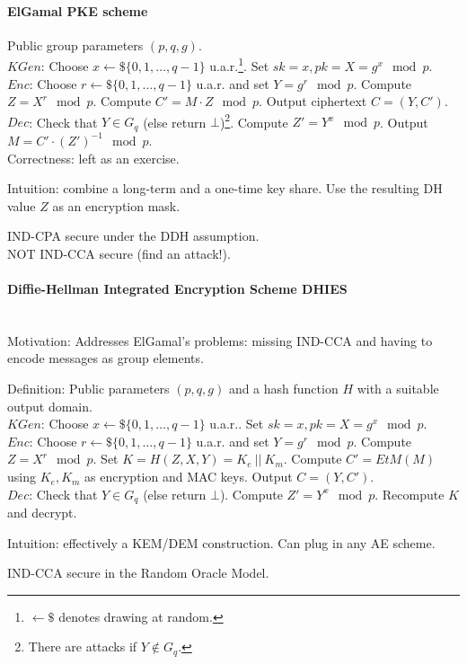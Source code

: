 \paragraph{ElGamal PKE scheme}
Public group parameters $(p, q, g)$.
\\
$KGen$:
Choose $x \leftarrow \$ \{ 0, 1, \dots, q-1 \}$ u.a.r.\footnote{$\leftarrow\$$ denotes drawing at random.}.
Set $sk = x, pk = X = g^x \mod p$.
\\
$Enc$:
Choose $r \leftarrow \$ \{ 0, 1, \dots, q-1 \}$ u.a.r. and set $Y = g^r \mod p$.
Compute $Z = X^r \mod p$.
Compute $C' = M \cdot Z \mod p$.
Output ciphertext $C = (Y, C')$.
\\
$Dec$:
Check that $Y \in G_q$ (else return $\bot$)\footnote{There are attacks if $Y \not \in G_q$.}.
Compute $Z' = Y^x \mod p$.
Output $M = C' \cdot (Z')^{-1} \mod p$.
\\
Correctness: left as an exercise.

Intuition: combine a long-term and a one-time key share.
Use the resulting DH value $Z$ as an encryption mask.

IND-CPA secure under the DDH assumption. \\
NOT IND-CCA secure (find an attack!).


\paragraph{Diffie-Hellman Integrated Encryption Scheme DHIES} \mbox{} \\
Motivation:
Addresses ElGamal's problems: missing IND-CCA and having to encode messages as group elements.

Definition:
Public parameters $(p,q,g)$ and a hash function $H$ with a suitable output domain.
\\
$KGen$:
Choose $x \leftarrow \$ \{ 0, 1, \dots, q-1 \}$ u.a.r..
Set $sk = x, pk = X = g^x \mod p$.
\\
$Enc$:
Choose $r \leftarrow \$ \{ 0, 1, \dots, q-1 \}$ u.a.r. and set $Y = g^r \mod p$.
Compute $Z = X^r \mod p$.
Set $K = H(Z, X, Y) = K_e\ ||\ K_m$.
Compute $C' = EtM(M)$ using $K_e, K_m$ as encryption and MAC keys.
Output $C=(Y, C')$.
\\
$Dec$:
Check that $Y \in G_q$ (else return $\bot$).
Compute $Z' = Y^x \mod p$.
Recompute $K$ and decrypt.

Intuition: effectively a KEM/DEM construction. Can plug in any AE scheme.

IND-CCA secure in the Random Oracle Model.



